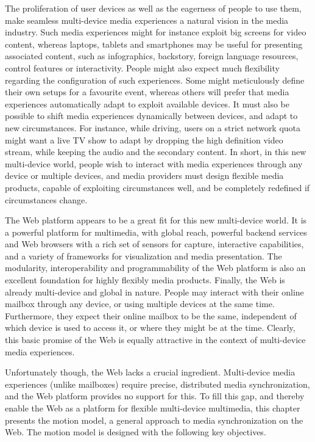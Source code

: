 The proliferation of user devices as well as the eagerness of people to use
them, make seamless multi-device media experiences a natural vision in the
media industry. Such media experiences might for instance exploit big screens
for video content, whereas laptops, tablets and smartphones may be useful for
presenting associated content, such as infographics, backstory, foreign
language resources, control features or interactivity. People might also
expect much flexibility regarding the configuration of such experiences. Some
might meticulously define their own setups for a favourite event, whereas
others will prefer that media experiences automatically adapt to exploit
available devices. It must also be possible to shift media experiences
dynamically between devices, and adapt to new circumstances. For instance,
while driving, users on a strict network quota might want a live TV show to
adapt by dropping the high definition video stream, while keeping the audio
and the secondary content. In short, in this new multi-device world, people
wish to interact with media experiences through any device or multiple
devices, and media providers must design flexible media products, capable of
exploiting circumstances well, and be completely redefined if circumstances
change.

The Web platform appears to be a great fit for this new multi-device world. It
is a powerful platform for multimedia, with global reach, powerful backend
services and Web browsers with a rich set of sensors for capture, interactive
capabilities, and a variety of frameworks for visualization and media
presentation. The modularity, interoperability and programmability of the Web
platform is also an excellent foundation for highly flexibly media products.
Finally, the Web is already multi-device and global in nature. People may
interact with their online mailbox through any device, or using multiple
devices at the same time. Furthermore, they expect their online mailbox to be
the same, independent of which device is used to access it, or where they
might be at the time. Clearly, this basic promise of the Web is equally
attractive in the context of multi-device media experiences.
 
Unfortunately though, the Web lacks a crucial ingredient. Multi-device media
experiences (unlike mailboxes) require precise, distributed media
synchronization, and the Web platform provides no support for this. To fill
this gap, and thereby enable the Web as a platform for flexible multi-device
multimedia, this chapter presents the motion model, a general approach to
media synchronization on the Web. The motion model is designed with the
following key objectives.

